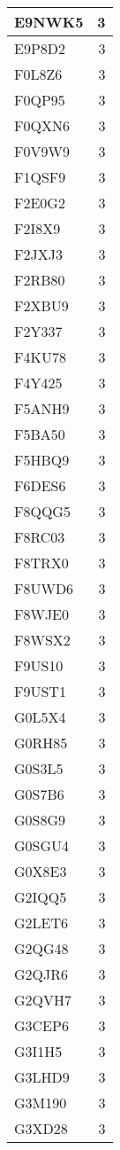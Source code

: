 \documentclass[
]{book}
\theoremstyle{definition}
\theoremstyle{definition}
\theoremstyle{definition}
\theoremstyle{definition}
\theoremstyle{remark}
\begin{document}
\begin{table}
\begin{tabular}{l|r}
\hline
E9NWK5 & 3\\
\hline
E9P8D2 & 3\\
\hline
F0L8Z6 & 3\\
\hline
F0QP95 & 3\\
\hline
F0QXN6 & 3\\
\hline
F0V9W9 & 3\\
\hline
F1QSF9 & 3\\
\hline
F2E0G2 & 3\\
\hline
F2I8X9 & 3\\
\hline
F2JXJ3 & 3\\
\hline
F2RB80 & 3\\
\hline
F2XBU9 & 3\\
\hline
F2Y337 & 3\\
\hline
F4KU78 & 3\\
\hline
F4Y425 & 3\\
\hline
F5ANH9 & 3\\
\hline
F5BA50 & 3\\
\hline
F5HBQ9 & 3\\
\hline
F6DES6 & 3\\
\hline
F8QQG5 & 3\\
\hline
F8RC03 & 3\\
\hline
F8TRX0 & 3\\
\hline
F8UWD6 & 3\\
\hline
F8WJE0 & 3\\
\hline
F8WSX2 & 3\\
\hline
F9US10 & 3\\
\hline
F9UST1 & 3\\
\hline
G0L5X4 & 3\\
\hline
G0RH85 & 3\\
\hline
G0S3L5 & 3\\
\hline
G0S7B6 & 3\\
\hline
G0S8G9 & 3\\
\hline
G0SGU4 & 3\\
\hline
G0X8E3 & 3\\
\hline
G2IQQ5 & 3\\
\hline
G2LET6 & 3\\
\hline
G2QG48 & 3\\
\hline
G2QJR6 & 3\\
\hline
G2QVH7 & 3\\
\hline
G3CEP6 & 3\\
\hline
G3I1H5 & 3\\
\hline
G3LHD9 & 3\\
\hline
G3M190 & 3\\
\hline
G3XD28 & 3\\

\end{tabular}
\end{table}
\end{document}
